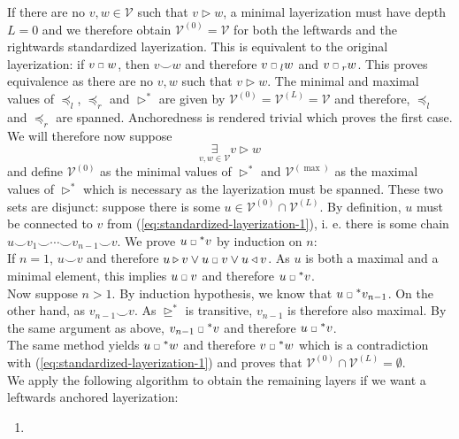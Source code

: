 \documentclass[a4paper,11pt]{report}
\newcommand{\conn}{\smile} %
\newcommand{\smallsquare}{\;\scalebox{0.6}{$\square$}\;}
\begin{document}
\begin{Bew}
If there are no $v,w\in\mathcal{V}$ such that $v\triangleright w$, a minimal layerization must have depth $L=0$ and we therefore obtain $\mathcal{V}^{(0)}=\mathcal{V}$ for both the leftwards and the rightwards standardized layerization. This is equivalent to the original layerization: if $v\smallsquare w$, then $v\conn w$ and therefore $v\smallsquare_lw$ and $v\smallsquare_rw$. This proves equivalence as there are no $v,w$ such that $v\triangleright w$. The minimal and maximal values of $\preceq_l$, $\preceq_r$ and $\triangleright^*$ are given by $\mathcal{V}^{(0)}=\mathcal{V}^{(L)}=\mathcal{V}$ and therefore, $\preceq_l$ and $\preceq_r$ are spanned. Anchoredness is rendered trivial which proves the first case. We will therefore now suppose
\begin{equation}\label{eq:standardized-layerization-1}
\underset{v,w\in\mathcal{V}}{\exists}v\triangleright w
\end{equation}
and define $\mathcal{V}^{(0)}$ as the minimal values of $\triangleright^*$ and $\mathcal{V}^{(\max)}$ as the maximal values of $\triangleright^*$ which is necessary as the layerization must be spanned. These two sets are disjunct: suppose there is some $u\in\mathcal{V}^{(0)}\cap\mathcal{V}^{(L)}$. By definition, $u$ must be connected to $v$ from (\ref{eq:standardized-layerization-1}), i. e. there is some chain $u\conn v_1\conn\dotsb\conn v_{n-1}\conn v$. We prove $u\smallsquare^*v$ by induction on $n$:\\
If $n=1$, $u\conn v$ and therefore $u\triangleright v\vee u\smallsquare v\vee u\triangleleft v$. As $u$ is both a maximal and a minimal element, this implies $u\smallsquare v$ and therefore $u\smallsquare^* v$.\\
Now suppose $n>1$. By induction hypothesis, we know that $u\smallsquare^* v_{n-1}$. On the other hand, as $v_{n-1}\conn v$. As $\trianglerighteq^*$ is transitive, $v_{n-1}$ is therefore also maximal. By the same argument as above, $v_{n-1}\smallsquare^* v$ and therefore $u\smallsquare^* v$.\\
The same method yields $u\smallsquare^* w$ and therefore $v\smallsquare^* w$ which is a contradiction with (\ref{eq:standardized-layerization-1}) and proves that $\mathcal{V}^{(0)}\cap\mathcal{V}^{(L)}=\emptyset$.\\
We apply the following algorithm to obtain the remaining layers if we want a leftwards anchored layerization:
\begin{enumerate}
\item

\end{enumerate}
\end{Bew}
\end{document}
